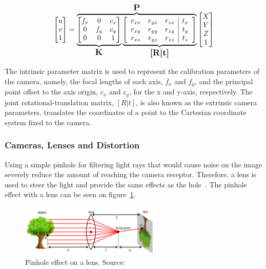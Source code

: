 \begin{equation}
	\label{eq:camera_transform_full}
	\begin{bmatrix}
		u \\
		v \\
		1
	\end{bmatrix}
	= 
	\overbrace{
		\underbrace{
			\begin{bmatrix}
				f_x & 0 & c_x \\
				0 & f_y & c_y \\
				0 & 0 & 1 
			\end{bmatrix}
		}_\text{\large\textbf{K}}
		\underbrace{
			\left[
				\begin{array}{ccc|c}
					r_{xx} & r_{yx} & r_{zx} & t_x \\
					r_{xy} & r_{yy} & r_{zy} & t_y \\
					r_{xz} & r_{yz} & r_{zz} & t_z 
				\end{array}
		\right]
		}_\text{\large\textbf{[R|t]}}
	}^\text{\large\textbf{P}}
	\begin{bmatrix}
		X \\
		Y \\
		Z \\
		1
	\end{bmatrix}
\end{equation}

The intrinsic parameter matrix is used to represent the calibration parameters of the camera, namely, the focal lengths of each axis, $f_x$ and $f_y$, and the principal point offset to the axis origin, $c_x$ and $c_y$, for the x and y-axis, respectively. The joint rotational-translation matrix, $[R|t]$, is also known as the extrinsic camera parameters, translates the coordinates of a point to the Cartesian coordinate system fixed to the camera.


\subsubsection{Cameras, Lenses and Distortion}
Using a simple pinhole for filtering light rays that would cause noise on the image severely reduce the amount of reaching the camera receptor. Therefore, a lens is used to steer the light and provide the same effects as the hole~\cite{Sturm2010}. The pinhole effect with a lens can be seen on figure~\ref{fig:pinhole_with_lense}.

\begin{figure}[H]
	\centering
	\includegraphics[width=0.6\textwidth]{img/camera/pinhole_with_lense.png}
	\caption{Pinhole effect on a lens. Source:~\cite{camera_models}}
	\label{fig:pinhole_with_lense}
\end{figure}

